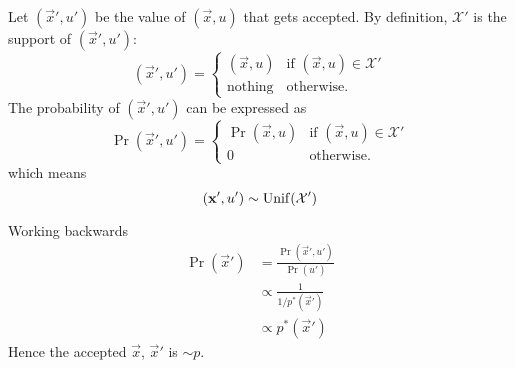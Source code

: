     Let $(\vec x', u')$ be the value of $(\vec x, u)$ that gets accepted. By definition, $\mathcal X'$ is the support of $(\vec x', u')$:
    \begin{equation}
        (\vec x', u') =
            \begin{cases}
                (\vec x, u)     & \text{if } (\vec x, u) \in \mathcal X' \\
                \text{nothing}  & \text{otherwise.}
            \end{cases}
    \end{equation}
    The probability of $(\vec x', u')$ can be expressed as
    \begin{equation}
        \Pr(\vec x', u') =
            \begin{cases}
                \Pr(\vec x, u)  & \text{if } (\vec x, u) \in \mathcal X' \\
                0               & \text{otherwise.}
            \end{cases}
    \end{equation}
    which means
    \begin{equation}
        (\boldsymbol{\mathbf{x}}', u') \sim \operatorname{Unif}(\mathcal X')
    \end{equation}

    Working backwards
    \begin{align}
        \Pr(\vec x')    &= \frac{\Pr(\vec x', u')}{\Pr(u')} \\
                        &\propto \frac{1}{1 / p^\ast(\vec x')} \\
                        &\propto p^\ast(\vec x')
    \end{align}
    Hence the accepted $\vec x$, $\vec x'$ is $\sim p$.